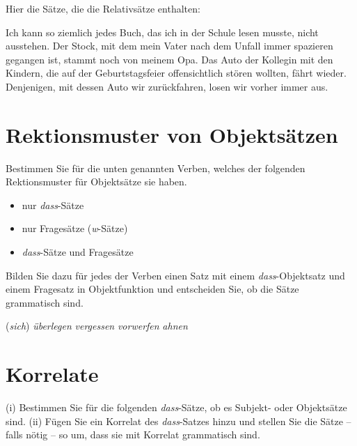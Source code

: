 \documentclass[12pt,a4paper,twoside]{article}
\newcommand{\Halbzeile}{\vspace{0.5\baselineskip}}
\newcommand{\Lf}{
  \setlength{\itemsep}{1pt}
  \setlength{\parskip}{0pt}
  \setlength{\parsep}{0pt}
}
\begin{document}
\Halbzeile

Hier die Sätze, die die Relativsätze enthalten:

\begin{exe}
\setcounter{xnumi}{0}
  \ex Ich kann so ziemlich jedes Buch, das ich in der Schule lesen musste, nicht ausstehen.
  \ex Der Stock, mit dem mein Vater nach dem Unfall immer spazieren gegangen ist, stammt noch von meinem Opa.
  \ex Das Auto der Kollegin mit den Kindern, die auf der Geburtstagsfeier offensichtlich stören wollten, fährt wieder.
  \ex Denjenigen, mit dessen Auto wir zurückfahren, losen wir vorher immer aus.
\end{exe}

\newpage

\section{Rektionsmuster von Objektsätzen}\label{sec:nebensaetze}

Bestimmen Sie für die unten genannten Verben, welches der folgenden Rektionsmuster für Objektsätze sie haben.

\begin{itemize}\Lf
  \item nur \textit{dass}-Sätze
  \item nur Fragesätze (\textit{w}-Sätze)
  \item \textit{dass}-Sätze und Fragesätze
\end{itemize}

Bilden Sie dazu für jedes der Verben einen Satz mit einem \textit{dass}-Objektsatz und einem Fragesatz in Objektfunktion und entscheiden Sie, ob die Sätze grammatisch sind.

\begin{exe}
\setcounter{xnumi}{0}
\ex (\textit{sich}) \textit{überlegen} %
  \ex \textit{vergessen} %
  \ex \textit{vorwerfen} %
  \ex \textit{ahnen} %
\end{exe}

\section{Korrelate}\label{sec:korrelate}

(i) Bestimmen Sie für die folgenden \textit{dass}-Sätze, ob es Subjekt- oder Objektsätze sind.
(ii) Fügen Sie ein Korrelat des \textit{dass}-Satzes hinzu und stellen Sie die Sätze -- falls nötig -- so um, dass sie mit Korrelat grammatisch sind.
\end{document}
